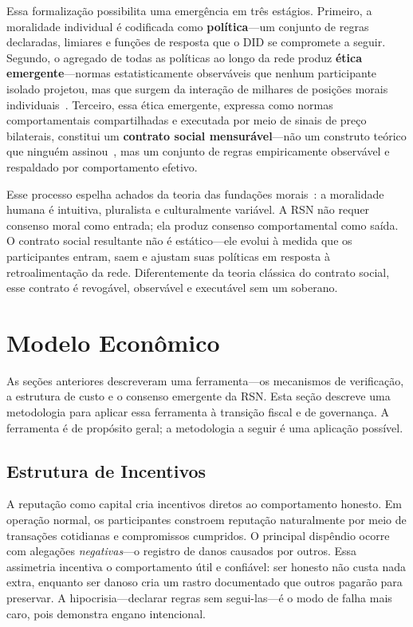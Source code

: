 \documentclass[11pt,a4paper,twocolumn]{article}
\begin{document}
Essa formalização possibilita uma emergência em três estágios. Primeiro, a moralidade individual é codificada como \textbf{política}---um conjunto de regras declaradas, limiares e funções de resposta que o DID se compromete a seguir. Segundo, o agregado de todas as políticas ao longo da rede produz \textbf{ética emergente}---normas estatisticamente observáveis que nenhum participante isolado projetou, mas que surgem da interação de milhares de posições morais individuais~\cite{durkheim1893}. Terceiro, essa ética emergente, expressa como normas comportamentais compartilhadas e executada por meio de sinais de preço bilaterais, constitui um \textbf{contrato social mensurável}---não um construto teórico que ninguém assinou~\cite{rawls1971}, mas um conjunto de regras empiricamente observável e respaldado por comportamento efetivo.

Esse processo espelha achados da teoria das fundações morais~\cite{haidt2012}: a moralidade humana é intuitiva, pluralista e culturalmente variável. A RSN não requer consenso moral como entrada; ela produz consenso comportamental como saída. O contrato social resultante não é estático---ele evolui à medida que os participantes entram, saem e ajustam suas políticas em resposta à retroalimentação da rede. Diferentemente da teoria clássica do contrato social, esse contrato é revogável, observável e executável sem um soberano.

\section{Modelo Econômico}

As seções anteriores descreveram uma ferramenta---os mecanismos de verificação, a estrutura de custo e o consenso emergente da RSN. Esta seção descreve uma metodologia para aplicar essa ferramenta à transição fiscal e de governança. A ferramenta é de propósito geral; a metodologia a seguir é uma aplicação possível.

\subsection{Estrutura de Incentivos}

A reputação como capital cria incentivos diretos ao comportamento honesto. Em operação normal, os participantes constroem reputação naturalmente por meio de transações cotidianas e compromissos cumpridos. O principal dispêndio ocorre com alegações \emph{negativas}---o registro de danos causados por outros. Essa assimetria incentiva o comportamento útil e confiável: ser honesto não custa nada extra, enquanto ser danoso cria um rastro documentado que outros pagarão para preservar. A hipocrisia---declarar regras sem segui-las---é o modo de falha mais caro, pois demonstra engano intencional.
\end{document}
